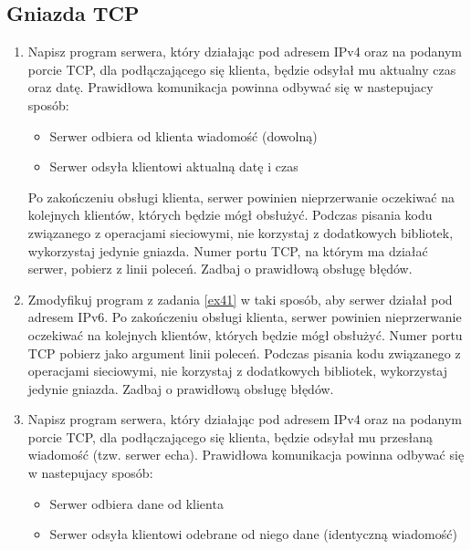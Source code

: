 \documentclass{article}
\begin{document}
\subsection*{Gniazda TCP}

\begin{enumerate}[label=\textbf{4.\arabic*}]\setlength{\itemsep}{1em}

\item \label{ex41} Napisz program serwera, który działając pod adresem IPv4 oraz na podanym porcie TCP, dla podłączającego się klienta, będzie odsyłał mu aktualny czas oraz datę. Prawidłowa komunikacja powinna odbywać się w nastepujacy sposób: 

\begin{itemize}
\item Serwer odbiera od klienta wiadomość (dowolną)
\item Serwer odsyła klientowi aktualną datę i czas
\end{itemize}

\noindent Po zakończeniu obsługi klienta, serwer powinien nieprzerwanie oczekiwać na kolejnych klientów, których będzie mógł obsłużyć. Podczas pisania kodu związanego z operacjami sieciowymi, nie korzystaj z dodatkowych bibliotek, wykorzystaj jedynie gniazda. Numer portu TCP, na którym ma działać serwer, pobierz z linii poleceń. Zadbaj o prawidłową obsługę błędów. 

\item Zmodyfikuj program z zadania \ref{ex41} w taki sposób,  aby serwer działał pod adresem IPv6. Po zakończeniu obsługi klienta, serwer powinien nieprzerwanie oczekiwać na kolejnych klientów, których będzie mógł obsłużyć. Numer portu TCP pobierz jako argument linii poleceń. Podczas pisania kodu związanego z operacjami sieciowymi, nie korzystaj z dodatkowych bibliotek, wykorzystaj jedynie gniazda. Zadbaj o prawidłową obsługę błędów. 

\item \label{ex42} Napisz program serwera, który działając  pod adresem IPv4 oraz na podanym porcie TCP, dla podłączającego się klienta, będzie odsyłał mu przesłaną wiadomość (tzw. serwer echa). Prawidłowa komunikacja powinna odbywać się w nastepujacy sposób:

\begin{itemize}
\item Serwer odbiera dane od klienta
\item Serwer odsyła klientowi odebrane od niego dane (identyczną wiadomość) 
\end{itemize}


\end{enumerate}
\end{document}
